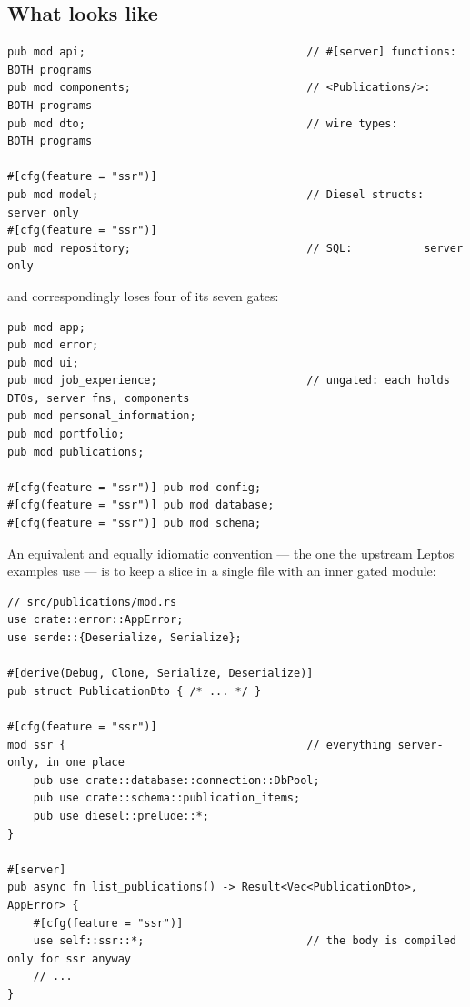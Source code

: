 \subsection{What  looks like}

\begin{lstlisting}[style=rs,caption={\file{src/publications/mod.rs} --- the gate lives here, per file. This
is the change that unblocks the component already sitting in that directory.}]
pub mod api;                                  // #[server] functions: BOTH programs
pub mod components;                           // <Publications/>:     BOTH programs
pub mod dto;                                  // wire types:          BOTH programs

#[cfg(feature = "ssr")]
pub mod model;                                // Diesel structs: server only
#[cfg(feature = "ssr")]
pub mod repository;                           // SQL:           server only
\end{lstlisting}

and correspondingly  loses four of its seven gates:

\begin{lstlisting}[style=rs,caption={\file{src/lib.rs} --- only the genuinely server-only roots stay gated.}]
pub mod app;
pub mod error;
pub mod ui;
pub mod job_experience;                       // ungated: each holds DTOs, server fns, components
pub mod personal_information;
pub mod portfolio;
pub mod publications;

#[cfg(feature = "ssr")] pub mod config;
#[cfg(feature = "ssr")] pub mod database;
#[cfg(feature = "ssr")] pub mod schema;
\end{lstlisting}

An equivalent and equally idiomatic convention --- the one the upstream Leptos examples use --- is
to keep a slice in a single file with an inner gated module:

\begin{lstlisting}[style=rs,caption={The single-file variant, for slices small enough not to need four files.}]
// src/publications/mod.rs
use crate::error::AppError;
use serde::{Deserialize, Serialize};

#[derive(Debug, Clone, Serialize, Deserialize)]
pub struct PublicationDto { /* ... */ }

#[cfg(feature = "ssr")]
mod ssr {                                     // everything server-only, in one place
    pub use crate::database::connection::DbPool;
    pub use crate::schema::publication_items;
    pub use diesel::prelude::*;
}

#[server]
pub async fn list_publications() -> Result<Vec<PublicationDto>, AppError> {
    #[cfg(feature = "ssr")]
    use self::ssr::*;                         // the body is compiled only for ssr anyway
    // ...
}
\end{lstlisting}

